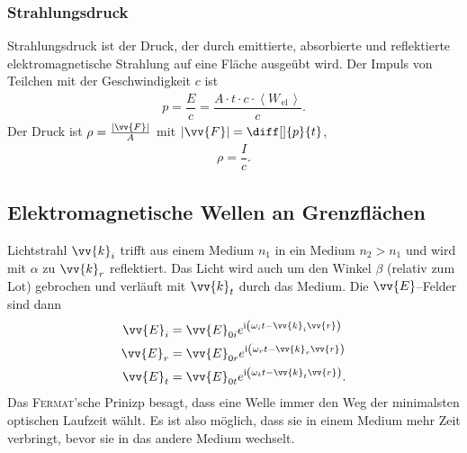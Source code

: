 \documentclass[a4paper,12pt]{article}
\numberwithin{equation}{section}
\begin{document}
\subsubsection{Strahlungsdruck}
Strahlungsdruck ist der Druck, der durch emittierte, absorbierte und reflektierte elektromagnetische Strahlung auf eine Fläche ausgeübt wird. Der Impuls von Teilchen mit der Geschwindigkeit $c$ ist
\begin{align} 
        p=\dfrac{E}{c}=\dfrac{A\cdot t\cdot c\cdot  \left\langle W_{\,\text{el}\,}\right\rangle }{c}
.\end{align} 
Der Druck ist $\rho =\tfrac{|\vv{F}|}{A}$ mit $|\vv{F}|=\diff[]{p}{t}$,
\begin{align} 
        \rho =\dfrac{I}{c}
.\end{align} 

\subsection{Elektromagnetische Wellen an Grenzflächen}
Lichtstrahl $\vv{k}_i$ trifft aus einem Medium $n_1$ in ein Medium $n_2>n_1$ und wird mit $\alpha $ zu $\vv{k}_r$ reflektiert. Das Licht wird auch um den Winkel $\beta $ (relativ zum Lot) gebrochen und verläuft mit $\vv{k}_t$ durch das Medium. Die $\vv{E}$--Felder sind dann
\begin{align} 
        \vv{E}_i&=\vv{E}_{0i}e^{\text{i}\left(\omega _it-\vv{k}_i\vv{r}\right)}\\
        \vv{E}_r&=\vv{E}_{0r}e^{\text{i}\left(\omega _rt-\vv{k}_r\vv{r}\right)}\\
        \vv{E}_t&=\vv{E}_{0t}e^{\text{i}\left(\omega _tt-\vv{k}_t\vv{r}\right)}
.\end{align} 
Das \textsc{Fermat}'sche Prinizp besagt, dass eine Welle immer den Weg der minimalsten optischen Laufzeit wählt. Es ist also möglich, dass sie in einem Medium mehr Zeit verbringt, bevor sie in das andere Medium wechselt.
\end{document}

